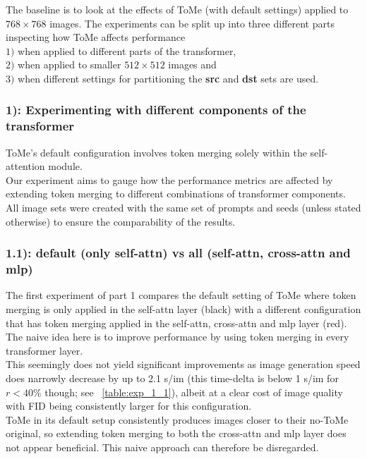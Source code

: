 The baseline is to look at the effects of ToMe (with default settings) applied to $768 \times 768$ images. The experiments can be split up into three different parts inspecting how ToMe affects performance\\ \(1)\) when applied to different parts of the transformer,\\ \(2)\) when applied to smaller $512 \times 512$ images and\\ \(3)\) when different settings for partitioning the \textbf{src} and \textbf{dst} sets are used.

\subsubsection*{1): Experimenting with different components of the transformer}
ToMe's default configuration involves token merging solely within the self-attention module.\\
Our experiment aims to gauge how the performance metrics are affected by extending token merging to different combinations of transformer components.\\
All image sets were created with the same set of prompts and seeds (unless stated otherwise) to ensure the comparability of the results.

\subsubsection*{1.1): default (only self-attn) vs all (self-attn, cross-attn and mlp)}
\begin{figure}[!htb]
   
   
\end{figure}
The first experiment of part 1 compares the default setting of ToMe where token merging is only applied in the self-attn layer (black) with a different configuration that has token merging applied in the self-attn, cross-attn and mlp layer (red). 
The naive idea here is to improve performance by using token merging in every transformer layer.\\
This seemingly does not yield significant improvements as image generation speed does narrowly decrease by up to 2.1 s/im (this time-delta is below 1 s/im for $r<40\%$ though; see ~\ref{table:exp_1_1}), albeit at a clear cost of image quality with FID being consistently larger for this configuration. \\
ToMe in its default setup consistently produces images closer to their no-ToMe original, so extending token merging to both the cross-attn and mlp layer does not appear beneficial. This naive approach can therefore be disregarded.


